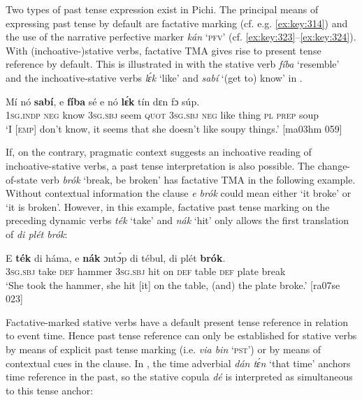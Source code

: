 Two types of past tense expression exist in Pichi. The principal means of expressing past tense by default are factative marking (cf. e.g. \ref{ex:key:314}) and the use of the narrative perfective{\fff} marker \textit{kán} ‘\textsc{pfv}’ (cf. \ref{ex:key:323}–\ref{ex:key:324}). With (inchoative-)stative verbs, factative TMA gives rise to present tense{\fff} reference by default. This is illustrated in  with the stative verb \textit{fíba} ‘resemble’ and the inchoative-stative verbs \textit{lɛ́k} ‘like’ and \textit{sabí} ‘(get to) know’ in . 


\ea%
    \label{ex:key:378}
    \gll Mí    nó  \textbf{sabí},  e    \textbf{fíba}    sé    e    nó  \textbf{lɛ́k}
tín     dɛn  fɔ  súp.\\
\textsc{1sg.indp}  \textsc{neg}  know  \textsc{3sg.sbj}  seem  \textsc{quot}    \textsc{3sg.sbj}  \textsc{neg}  like
thing   \textsc{pl}  \textsc{prep}  soup\\

\glt ‘I \textsc{[emp]} don’t know, it seems that she doesn’t like soupy things.’ [ma03hm 059]
\z

If, on the contrary, pragmatic context suggests an inchoative reading of inchoative-stative verbs, a past tense interpretation is also possible. The change-of-state verb \textit{brók} ‘break, be broken’ has factative TMA in the following example. Without contextual information the clause \textit{e brók} could mean either ‘it broke’ or ‘it is broken’. However, in this example, factative past tense marking on the preceding dynamic verbs \textit{ték} ‘take’ and \textit{nák} ‘hit’ only allows the first translation of \textit{di plét brók}: 


\ea%
    \label{ex:key:379}
    \gll E    \textbf{ték}    di  háma,  e    \textbf{nák}  ɔntɔ́p  di  tébul,
di  plét    \textbf{brók}.\\
\textsc{3sg.sbj}  take    \textsc{def}  hammer  \textsc{3sg.sbj}  hit  on    \textsc{def}  table
\textsc{def}  plate  break\\

\glt ‘She took the hammer, she hit [it] on the table, (and) the plate broke.’ [ra07se 023]
\z

Factative-marked stative verbs have a default present tense reference in relation to event time. Hence past tense reference can only be established for stative verbs by means of explicit past tense marking (i.e. \textit{via bin} ‘\textsc{pst}’) or by means of contextual cues in the clause. In , the time adverbial \textit{dán tɛ́n} ‘that time’ anchors time reference in the past, so the stative copula \textit{dé} is interpreted as simultaneous to this tense anchor:



